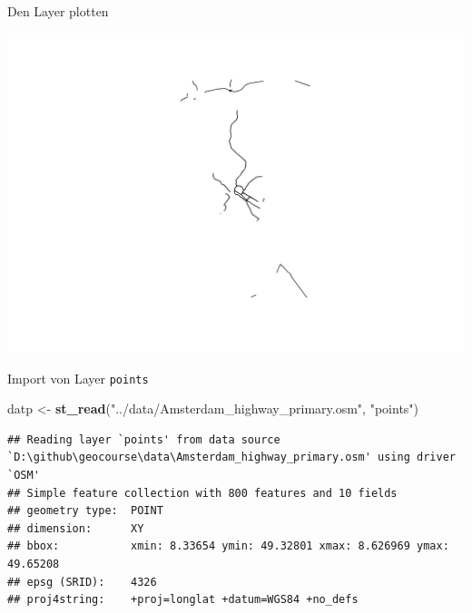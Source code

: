 \documentclass[ignorenonframetext,]{beamer}
\newenvironment{Shaded}{\begin{snugshade}}{\end{snugshade}}
\newcommand{\KeywordTok}[1]{\textcolor[rgb]{0.26,0.66,0.93}{\textbf{#1}}}
\newcommand{\NormalTok}[1]{\textcolor[rgb]{0.74,0.68,0.62}{#1}}
\newcommand{\OperatorTok}[1]{\textcolor[rgb]{0.74,0.68,0.62}{#1}}
\newcommand{\StringTok}[1]{\textcolor[rgb]{0.02,0.61,0.04}{#1}}
\begin{document}
\begin{frame}[fragile]{Den Layer plotten}
\protect\hypertarget{den-layer-plotten}{}

\begin{Shaded}
\end{Shaded}

\includegraphics{B3_osm_mainapi_files/figure-beamer/unnamed-chunk-31-1.pdf}

\end{frame}

\begin{frame}[fragile]{Import von Layer \texttt{points}}
\protect\hypertarget{import-von-layer-points}{}

\begin{Shaded}
\begin{Highlighting}[]
\NormalTok{datp <-}\StringTok{ }\KeywordTok{st_read}\NormalTok{(}\StringTok{"../data/Amsterdam_highway_primary.osm"}\NormalTok{,}
                \StringTok{"points"}\NormalTok{)}
\end{Highlighting}
\end{Shaded}

\begin{verbatim}
## Reading layer `points' from data source `D:\github\geocourse\data\Amsterdam_highway_primary.osm' using driver `OSM'
## Simple feature collection with 800 features and 10 fields
## geometry type:  POINT
## dimension:      XY
## bbox:           xmin: 8.33654 ymin: 49.32801 xmax: 8.626969 ymax: 49.65208
## epsg (SRID):    4326
## proj4string:    +proj=longlat +datum=WGS84 +no_defs
\end{verbatim}

\end{frame}
\end{document}
